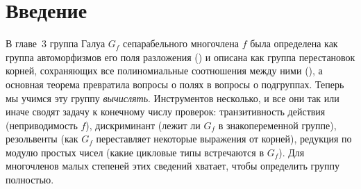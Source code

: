 \section*{Введение}

В главе~3 группа Галуа $G_f$ сепарабельного многочлена $f$ была определена как группа автоморфизмов его поля разложения
() и описана как группа перестановок корней, сохраняющих все полиномиальные соотношения между ними
(), а основная теорема превратила вопросы о полях в вопросы о подгруппах. Теперь мы учимся эту группу
\emph{вычислять}. Инструментов несколько, и все они так или иначе сводят задачу к конечному числу проверок:
транзитивность действия (неприводимость $f$), дискриминант (лежит ли $G_f$ в знакопеременной группе), резольвенты (как
$G_f$ переставляет некоторые выражения от корней), редукция по модулю простых чисел (какие цикловые типы встречаются в
$G_f$). Для многочленов малых степеней этих сведений хватает, чтобы определить группу полностью.

